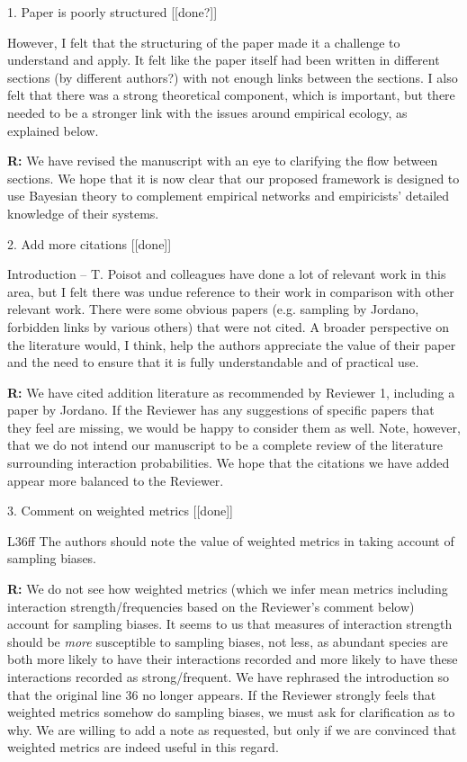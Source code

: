 \documentclass[12pt]{letter}
\newenvironment{refquote}{\bigskip \begin{it}}{\end{it}\smallskip}
\begin{document}
\begin{itemize}
	1. Paper is poorly structured [[done?]]

		\begin{refquote}
		However, I felt that the structuring of the paper made it a challenge to understand and apply. It felt like the paper itself had been written in different sections (by different authors?) with not enough links between the sections. I also felt that there was a strong theoretical component, which is important, but there needed to be a stronger link with the issues around empirical ecology, as explained below.
		\end{refquote}

		\textbf{R:} We have revised the manuscript with an eye to clarifying the flow between sections. We hope that it is now clear that our proposed framework is designed to use Bayesian theory to complement empirical networks and empiricists' detailed knowledge of their systems. 


	2. Add more citations [[done]]

		\begin{refquote}
		Introduction – T. Poisot and colleagues have done a lot of relevant work in this area, but I felt there was undue reference to their work in comparison with other relevant work. There were some obvious papers (e.g. sampling by Jordano, forbidden links by various others) that were not cited. A broader perspective on the literature would, I think, help the authors appreciate the value of their paper and the need to ensure that it is fully understandable and of practical use.
		\end{refquote}

		\textbf{R:} We have cited addition literature as recommended by Reviewer 1, including a paper by Jordano. If the Reviewer has any suggestions of specific papers that they feel are missing, we would be happy to consider them as well. Note, however, that we do not intend our manuscript to be a complete review of the literature surrounding interaction probabilities. We hope that the citations we have added appear more balanced to the Reviewer.


	3. Comment on weighted metrics [[done]]

		\begin{refquote}
		L36ff The authors should note the value of weighted metrics in taking account of sampling biases.
		\end{refquote}

		\textbf{R:} We do not see how weighted metrics (which we infer mean metrics including interaction strength/frequencies based on the Reviewer's comment below) account for sampling biases. It seems to us that measures of interaction strength should be \emph{more} susceptible to sampling biases, not less, as abundant species are both more likely to have their interactions recorded and more likely to have these interactions recorded as strong/frequent. We have rephrased the introduction so that the original line 36 no longer appears. If the Reviewer strongly feels that weighted metrics somehow do sampling biases, we must ask for clarification as to why. We are willing to add a note as requested, but only if we are convinced that weighted metrics are indeed useful in this regard.



\end{itemize}
\end{document}
